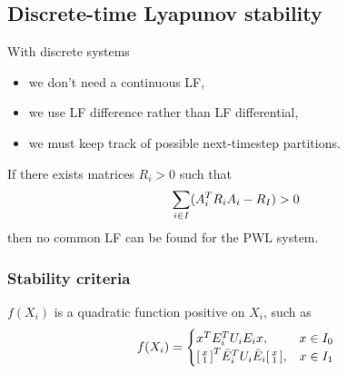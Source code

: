 \subsection{Discrete-time Lyapunov stability}
With discrete systems
%
\begin{itemize}
  \item we don't need a continuous LF,
  \item we use LF difference rather than LF differential,
  \item we must keep track of possible next-timestep partitions.
\end{itemize}

If there exists matrices $R_i > 0$ such that
%
\begin{equation}
  \sum_{i \in I} (A_i^{T} R_i A_i - R_I) > 0
\end{equation}
%
then no common LF can be found for the PWL system.

\subsubsection{Stability criteria}
$f(X_i)$ is a quadratic function positive on $X_i$, such as
%
\begin{equation}
  f(X_i) =
  \begin{cases}
    x^{T} E_i^{T} U_i E_i x, & x \in I_0 \\
    \begin{bsmallmatrix} x \\ 1 \end{bsmallmatrix}^{T} \bar{E}_i^{T} U_i \bar{E}_i \begin{bsmallmatrix} x \\ 1 \end{bsmallmatrix}, & x \in I_1
  \end{cases}
\end{equation}


